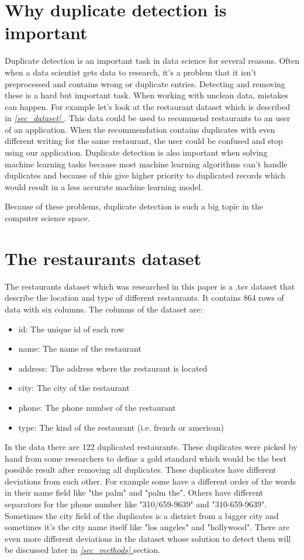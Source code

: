 \documentclass[conference]{IEEEtran}
\newcommand*{\fullref}[1]{\textit{\hyperref[{#1}]{\autoref*{#1} \nameref*{#1}}}}
\begin{document}
\section{Why duplicate detection is important}
Duplicate detection is an important task in data science for several reasons. Often when a data scientist gets data to research, it's a problem that it isn't preprocessed and contains wrong or duplicate entries. Detecting and removing these is a hard but important task. When working with unclean data, mistakes can happen. For example let's look at the restaurant dataset which is described in \fullref{sec_dataset}. This data could be used to recommend restaurants to an user of an application. When the recommendation contains duplicates with even different writing for the same restaurant, the user could be confused and stop using our application. Duplicate detection is also important when solving machine learning tasks because most machine learning algorithms can't handle duplicates and because of this give higher priority to duplicated records which would result in a less accurate machine learning model.

Because of these problems, duplicate detection is such a big topic in the computer science space.
\section{The restaurants dataset} \label{sec_dataset}
The restaurants dataset which was researched in this paper is a .tsv dataset that describe the location and type of different restaurants. It contains 864 rows of data with six columns. The columns of the dataset are: 
\begin{itemize}
	\item id: The unique id of each row
	\item name: The name of the restaurant
	\item address: The address where the restaurant is located
	\item city: The city of the restaurant
	\item phone: The phone number of the restaurant
	\item type: The kind of the restaurant (i.e. french or american)
\end{itemize}
In the data there are 122 duplicated restaurants. These duplicates were picked by hand from some researchers to define a gold standard which would be the best possible result after removing all duplicates. These duplicates have different deviations from each other. For example some have a different order of the words in their name field like "the palm" and "palm the". Others have different separators for the phone number like "310/659-9639" and "310-659-9639". Sometimes the city field of the duplicates is a district from a bigger city and sometimes it's the city name itself like "los angeles" and "hollywood". There are even more  different deviations in the dataset whose solution to detect them will be discussed later in \fullref{sec_methods} section.
\end{document}
